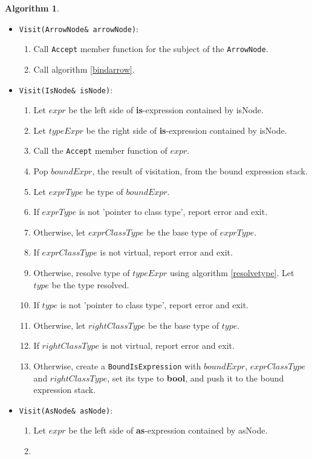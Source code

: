 \documentclass[a4paper,oneside,11pt]{book}
\theoremstyle{definition}
\newtheorem{algo}{Algorithm}[section]
\begin{document}
\begin{algo}
\begin{itemize}
Call algorithm \ref{bindindex}.
\item
\verb|Visit(ArrowNode& arrowNode)|:\\
\begin{enumerate}
\item
Call \verb|Accept| member function for the subject of the \verb|ArrowNode|.
\item
Call algorithm \ref{bindarrow}.
\end{enumerate}
\item
\verb|Visit(IsNode& isNode)|:\\
\begin{enumerate}
\item
Let $expr$ be the left side of \textbf{is}-expression contained by isNode.
\item
Let $typeExpr$ be the right side of \textbf{is}-expression contained by isNode.
\item
Call the \verb|Accept| member function of $expr$.
\item
Pop $boundExpr$, the result of visitation, from the bound expression stack.
\item
Let $exprType$ be type of $boundExpr$.
\item
If $exprType$ is not 'pointer to class type', report error and exit.
\item
Otherwise, let $exprClassType$ be the base type of $exprType$.
\item
If $exprClassType$ is not virtual, report error and exit.
\item
Otherwise, resolve type of $typeExpr$ using algorithm \ref{resolvetype}. Let $type$ be the type resolved.
\item
If $type$ is not 'pointer to class type', report error and exit.
\item
Otherwise, let $rightClassType$ be the base type of $type$.
\item
If $rightClassType$ is not virtual, report error and exit.
\item
Otherwise, create a \verb|BoundIsExpression| with $boundExpr$, $exprClassType$ and $rightClassType$, set its type to \textbf{bool},
and push it to the bound expression stack.
\end{enumerate}
\item
\verb|Visit(AsNode& asNode)|:\\
\begin{enumerate}
\item
Let $expr$ be the left side of \textbf{as}-expression contained by asNode.
\item

\end{enumerate}
\end{itemize}
\end{algo}
\end{document}
